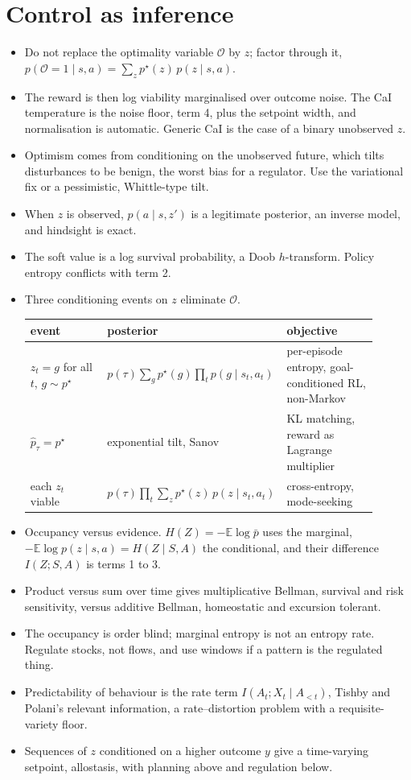 \documentclass[10pt]{article}
\newcommand{\E}{\mathbb E}
\begin{document}
\section{Control as inference}
\begin{itemize}
  \item Do not replace the optimality variable $\mathcal O$ by $z$; factor through it, $p(\mathcal O = 1 \mid s,a) = \sum_z p^\star(z)\, p(z \mid s,a)$.
  \item The reward is then log viability marginalised over outcome noise.
    The CaI temperature is the noise floor, term 4, plus the setpoint width, and normalisation is automatic.
    Generic CaI is the case of a binary unobserved $z$.
  \item Optimism comes from conditioning on the unobserved future, which tilts disturbances to be benign, the worst bias for a regulator.
    Use the variational fix or a pessimistic, Whittle-type tilt.
  \item When $z$ is observed, $p(a \mid s,z')$ is a legitimate posterior, an inverse model, and hindsight is exact.
  \item The soft value is a log survival probability, a Doob $h$-transform.
    Policy entropy conflicts with term 2.
  \item Three conditioning events on $z$ eliminate $\mathcal O$.

  \medskip
  \begin{tabular}{@{}p{0.27\linewidth}p{0.33\linewidth}p{0.3\linewidth}@{}}
    \toprule
    event & posterior & objective \\
    \midrule
    $z_t = g$ for all $t$, $g \sim p^\star$ & $p(\tau)\sum_g p^\star(g)\prod_t p(g \mid s_t,a_t)$ & per-episode entropy, goal-conditioned RL, non-Markov \\
    $\hat p_\tau = p^\star$ & exponential tilt, Sanov & KL matching, reward as Lagrange multiplier \\
    each $z_t$ viable & $p(\tau)\prod_t \sum_z p^\star(z)\, p(z \mid s_t,a_t)$ & cross-entropy, mode-seeking \\
    \bottomrule
  \end{tabular}
  \medskip

  \item Occupancy versus evidence.
    $H(Z) = -\E\log\bar p$ uses the marginal, $-\E\log p(z \mid s,a) = H(Z \mid S,A)$ the conditional, and their difference $I(Z;S,A)$ is terms 1 to 3.
  \item Product versus sum over time gives multiplicative Bellman, survival and risk sensitivity, versus additive Bellman, homeostatic and excursion tolerant.
  \item The occupancy is order blind; marginal entropy is not an entropy rate.
    Regulate stocks, not flows, and use windows if a pattern is the regulated thing.
  \item Predictability of behaviour is the rate term $I(A_t; X_t \mid A_{<t})$, Tishby and Polani's relevant information, a rate--distortion problem with a requisite-variety floor.
  \item Sequences of $z$ conditioned on a higher outcome $y$ give a time-varying setpoint, allostasis, with planning above and regulation below.
\end{itemize}
\end{document}
